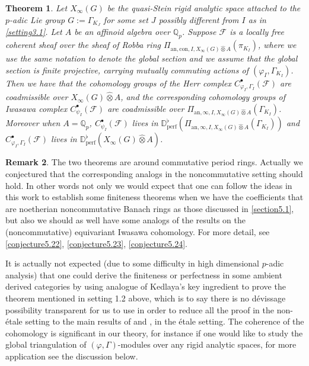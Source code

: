 \documentclass[12pt]{amsart}
\newtheorem{theorem}{Theorem}[section]
\theoremstyle{definition}
\newtheorem{remark}[theorem]{Remark}
\numberwithin{equation}{section}
\begin{document}
\begin{theorem}
Let $X_\infty(G)$ be the quasi-Stein rigid analytic space attached to the $p$-adic Lie group $G:=\Gamma_{K_J}$ for some set $J$ possibly different from $I$ as in \cref{setting3.1}. Let $A$ be an affinoid algebra over $\mathbb{Q}_p$. Suppose $\mathcal{F}$ is a locally free coherent sheaf over the sheaf of Robba ring $\Pi_{\mathrm{an},\mathrm{con},I,X_\infty(G)\widehat{\otimes} A}(\pi_{K_I})$, where we use the same notation to denote the global section and we assume that the global section is finite projective, carrying mutually commuting actions of $(\varphi_I,\Gamma_{K_I})$. Then we have that the cohomology groups of the Herr complex $C^\bullet_{\varphi_I,\Gamma_I}(\mathcal{F})$ are coadmissible over $X_\infty(G)\widehat{\otimes}A$, and the corresponding cohomology groups of Iwasawa complex $C^\bullet_{\psi_I} (\mathcal{F})$ are coadmissible over $\Pi_{\mathrm{an},\infty,I,X_\infty(G)\widehat{\otimes} A}(\Gamma_{K_I})$. Moreover when $A=\mathbb{Q}_p$, $C^\bullet_{\psi_I}(\mathcal{F})$ lives in $\mathbb{D}^\flat_{\mathrm{perf}}(\Pi_{\mathrm{an},\infty,I,X_\infty(G)\widehat{\otimes} A}(\Gamma_{K_I}))$ and $C^\bullet_{\varphi_I,\Gamma_I}(\mathcal{F})$ lives in $\mathbb{D}^\flat_{\mathrm{perf}}(X_\infty(G)\widehat{\otimes} A)$.
\end{theorem}


\begin{remark}
The two theorems are around commutative period rings. Actually we conjectured that the corresponding analogs in the noncommutative setting should hold. In other words not only we would expect that one can follow the ideas in this work to establish some finiteness theorems when we have the coefficients that are noetherian noncommutative Banach rings as those discussed in \cref{section5.1}, but also we should as well have some analogs of the results on the (noncommutative) equivariant Iwasawa cohomology. For more detail, see \cref{conjecture5.22}, \cref{conjecture5.23}, \cref{conjecture5.24}. 
\end{remark}

	










\indent It is actually not expected (due to some difficulty in high dimensional $p$-adic analysis) that one could derive the finiteness or perfectness in some ambient derived categories by using analogue of Kedlaya's key ingredient to prove the theorem mentioned in setting 1.2 above, which is to say there is no d\'evissage possibility transparent for us to use in order to reduce all the proof in the non-\'etale setting to the main results of \cite{CKZ18} and \cite{PZ19}, in the \'etale setting. The coherence of the cohomology is significant in our theory, for instance if one would like to study the global triangulation of $(\varphi,\Gamma)$-modules over any rigid analytic spaces, for more application see the discussion below.\\
\end{document}
